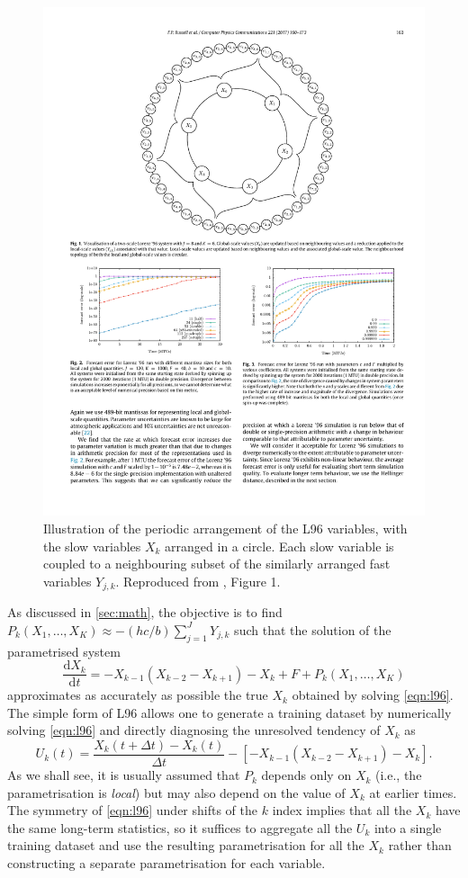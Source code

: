 \documentclass[titlepage,twoside]{article}
\numberwithin{equation}{section}
\newcommand{\diff}[2]{\frac{\mathrm{d} #1}{\mathrm{d} #2}}
\begin{document}
\begin{figure}[ht]
    \centering
    \includegraphics[width=0.7\linewidth]{figures/russell2017_L96_diagram.pdf}
    \caption{
        Illustration of the periodic arrangement of the L96 variables,
        with the slow variables $X_k$ arranged in a circle. Each slow variable
        is coupled to a neighbouring subset of the similarly arranged fast
        variables $Y_{j,k}$. Reproduced from \textcite{russell2017}, Figure 1.
    }
    \label{fig:L96_diagram}
\end{figure}

As discussed in \cref{sec:math}, the objective is to find $P_k(X_1, \dots, X_K)
\approx -(hc/b) \sum_{j=1}^J Y_{j,k}$ such that the solution of the
parametrised system
\begin{equation*}
    \diff{X_k}{t}
        = -X_{k-1} (X_{k-2} - X_{k+1}) - X_k + F + P_k(X_1, \dots, X_K)
\end{equation*}
approximates as accurately as possible the true $X_k$ obtained by solving
\cref{eqn:l96}. The simple form of L96 allows one to generate a training
dataset by numerically solving \cref{eqn:l96} and directly diagnosing the
unresolved tendency of $X_k$ as
\begin{equation} \label{eqn:l96_tendency}
    U_k(t) = \frac{X_k(t + \Delta t) - X_k(t)}{\Delta t}
        - \left[ -X_{k-1} (X_{k-2} - X_{k+1}) - X_k \right].
\end{equation}
As we shall see, it is usually assumed that $P_k$ depends only on $X_k$ (i.e.,
the parametrisation is \emph{local}) but may also depend on the value of $X_k$
at earlier times. The symmetry of \cref{eqn:l96} under shifts of the $k$ index
implies that all the $X_k$ have the same long-term statistics, so it suffices
to aggregate all the $U_k$ into a single training dataset and use the resulting
parametrisation for all the $X_k$ rather than constructing a separate
parametrisation for each variable.
\end{document}
